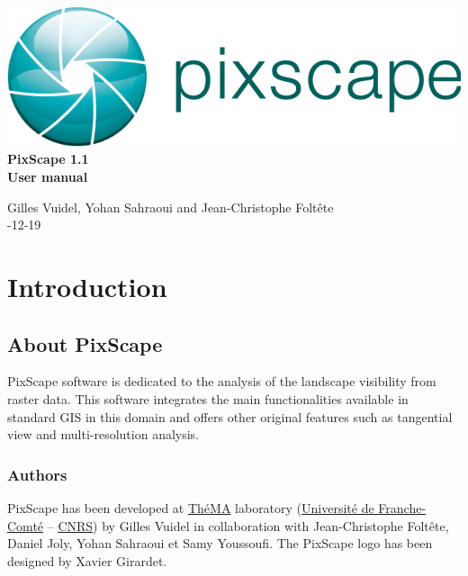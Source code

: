 \documentclass{report}
\begin{document}
 \begin{titlepage}
	
	\centering
	\includegraphics[scale=0.5]{img/logo.png}\\
	
	\bigskip
	\bigskip
	\bigskip	
	{\Huge
		\bfseries
		PixScape 1.1\\
		\bigskip
		User manual\\
	}
	\bigskip
	\bigskip
	\bigskip
	\bigskip
	\bigskip
	
	{\Large		
		Gilles Vuidel, Yohan Sahraoui and Jean-Christophe Foltête\\
		-12-19\\
	}
	
\end{titlepage}

\setcounter{tocdepth}{2}
\tableofcontents

\pagebreak

\chapter{Introduction}

\section{About PixScape}

PixScape software is dedicated to the analysis of the landscape visibility from raster data.
This software integrates the main functionalities available in standard GIS  in this domain and offers other original features such as tangential view and multi-resolution analysis.


\subsection{Authors}
PixScape has been developed at \href{http://thema.univ-fcomte.fr}{ThéMA} laboratory (\href{http://www.univ-fcomte.fr}{Université de Franche-Comté} – \href{http://www.cnrs.fr}{CNRS}) by Gilles Vuidel in collaboration with Jean-Christophe Foltête, Daniel Joly, Yohan Sahraoui et Samy Youssoufi. The PixScape logo has been designed by Xavier Girardet.
\end{document}
